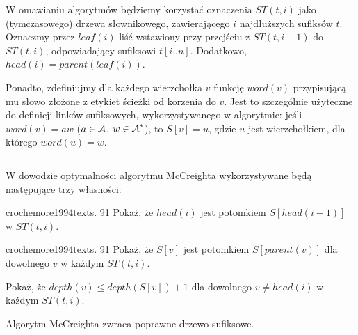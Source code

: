 W omawianiu algorytmów będziemy korzystać oznaczenia $ST(t, i)$ jako (tymczasowego) drzewa słownikowego, zawierającego $i$ najdłuższych sufiksów $t$. Oznaczmy przez $leaf(i)$ liść wstawiony przy przejściu z $ST(t, i - 1)$ do $ST(t, i)$, odpowiadający sufiksowi $t[i..n]$. Dodatkowo, $head(i) = parent(leaf(i))$.

Ponadto, zdefiniujmy dla każdego wierzchołka $v$ funkcję $word(v)$ przypisującą mu słowo złożone z etykiet ścieżki od korzenia do $v$.
Jest to szczególnie użyteczne do definicji linków sufiksowych, wykorzystywanego w algorytmie: jeśli $word(v) = aw$ ($a \in \operatorname{\mathcal{A}}$, $w \in \operatorname{\mathcal{A}}^*$), to $S[v] = u$, gdzie $u$ jest wierzchołkiem, dla którego $word(u) = w$.

\begin{code}
\inputminted{python}{code/suffix-tree/mccreight.py}
\label{alg:mccreight-suffix-tree}
\end{code}

W dowodzie optymalności algorytmu McCreighta wykorzystywane będą następujące trzy własności:
\begin{problem}{crochemore1994text}{s. 91}
  Pokaż, że $head(i)$ jest potomkiem $S[head(i - 1)]$ w $ST(t, i)$.
\end{problem}

\begin{problem}{crochemore1994text}{s. 91}
  Pokaż, że $S[v]$ jest potomkiem $S[parent(v)]$ dla dowolnego $v$ w każdym $ST(t, i)$.
\end{problem}

\begin{problem}{}{}
  Pokaż, że $depth(v) \le depth(S[v]) + 1$ dla dowolnego $v \neq head(i)$ w każdym $ST(t, i)$.
\end{problem}

\begin{theorem}{}{}
  Algorytm McCreighta zwraca poprawne drzewo sufiksowe.
\end{theorem}

